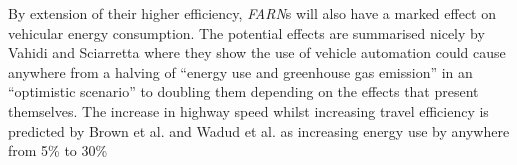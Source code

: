 By extension of their higher efficiency, \textit{FARN}s will also have a marked effect on vehicular energy consumption. The potential effects are summarised nicely by Vahidi and Sciarretta\cite{vahidiEnergySavingPotentials2018} where they show the use of vehicle automation could cause anywhere from a halving of ``energy use and greenhouse gas emission'' in an ``optimistic scenario'' to doubling them depending on the effects that present themselves. The increase in highway speed whilst increasing travel efficiency is predicted by Brown et al.\cite{brownAnalysisPossibleEnergy2014} and Wadud et al.\cite{wadudHelpHindranceTravel2016} as increasing energy use by anywhere from 5\% to 30\%


